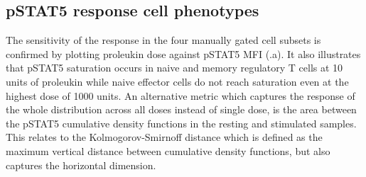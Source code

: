 
\subsection{pSTAT5 response cell phenotypes}

The sensitivity of the response in the four manually gated cell subsets is confirmed by plotting proleukin dose against pSTAT5 MFI (.a).
It also illustrates that pSTAT5 saturation occurs in naive and memory regulatory T cells at 10 units of proleukin while naive effector cells do not reach
saturation even at the highest dose of 1000 units.
An alternative metric which captures the response of the whole distribution across all doses instead of single dose, 
is the area between the pSTAT5 cumulative density functions in the resting and stimulated samples.
This relates to the Kolmogorov-Smirnoff distance which is defined as the maximum vertical distance between cumulative density functions,
but also captures the horizontal dimension.


